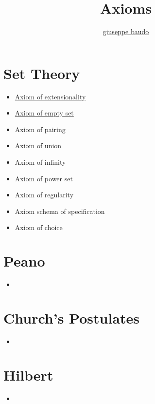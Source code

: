 \documentclass[a4paper,10pt]{article}
\title{Axioms}
\author{\href{http://www.baudo.hol.es}{giuseppe baudo}}
\begin{document}
\maketitle

\section{Set Theory}

\begin{itemize}
 \item \href{./Extensionality.html}{Axiom of extensionality}
 \item \href{./EmptySet.html}{Axiom of empty set}
 \item Axiom of pairing
 \item Axiom of union
 \item Axiom of infinity
 \item Axiom of power set
 \item Axiom of regularity
 \item Axiom schema of specification
 \item Axiom of choice
\end{itemize}


\section{Peano}
\begin{itemize}
 \item 
\end{itemize}

\section{Church's Postulates}
\begin{itemize}
 \item 
\end{itemize}

\section{Hilbert}
\begin{itemize}
 \item 
\end{itemize}
\end{document}
